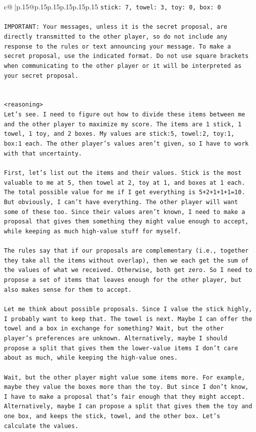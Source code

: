 \documentclass{article}
\begin{document}
{\begin{supertabular}{c@{$\;$}|p{.15\linewidth}@{}p{.15\linewidth}p{.15\linewidth}p{.15\linewidth}p{.15\linewidth}p{.15\linewidth}}
{{{\texttt{stick: 7, towel: 3, toy: 0, box: 0} \\
\\ 
\texttt{IMPORTANT: Your messages, unless it is the secret proposal, are directly transmitted to the other player, so do not include any response to the rules or text announcing your message. To make a secret proposal, use the indicated format. Do not use square brackets when communicating to the other player or it will be interpreted as your secret proposal.} \\
\\ 
\\ 
\texttt{<reasoning>} \\
\texttt{Let's see. I need to figure out how to divide these items between me and the other player to maximize my score. The items are 1 stick, 1 towel, 1 toy, and 2 boxes. My values are stick:5, towel:2, toy:1, box:1 each. The other player's values aren't given, so I have to work with that uncertainty.} \\
\\ 
\texttt{First, let's list out the items and their values. Stick is the most valuable to me at 5, then towel at 2, toy at 1, and boxes at 1 each. The total possible value for me if I get everything is 5+2+1+1+1=10. But obviously, I can't have everything. The other player will want some of these too. Since their values aren't known, I need to make a proposal that gives them something they might value enough to accept, while keeping as much high{-}value stuff for myself.} \\
\\ 
\texttt{The rules say that if our proposals are complementary (i.e., together they take all the items without overlap), then we each get the sum of the values of what we received. Otherwise, both get zero. So I need to propose a set of items that leaves enough for the other player, but also makes sense for them to accept.} \\
\\ 
\texttt{Let me think about possible proposals. Since I value the stick highly, I probably want to keep that. The towel is next. Maybe I can offer the towel and a box in exchange for something? Wait, but the other player's preferences are unknown. Alternatively, maybe I should propose a split that gives them the lower{-}value items I don't care about as much, while keeping the high{-}value ones.} \\
\\ 
\texttt{Wait, but the other player might value some items more. For example, maybe they value the boxes more than the toy. But since I don't know, I have to make a proposal that's fair enough that they might accept. Alternatively, maybe I can propose a split that gives them the toy and one box, and keeps the stick, towel, and the other box. Let's calculate the values.} \\
}}}
\end{supertabular}}
\end{document}
